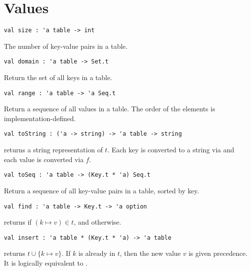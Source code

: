 \section{Values}

\begin{gram}[size]
\begin{verbatim}
val size : 'a table -> int
\end{verbatim}
The number of key-value pairs in a table.
\end{gram}

\begin{gram}[domain]
\begin{verbatim}
val domain : 'a table -> Set.t
\end{verbatim}
Return the set of all keys in a table.
\end{gram}

\begin{gram}[range]
\begin{verbatim}
val range : 'a table -> 'a Seq.t
\end{verbatim}
Return a sequence of all values in a table. The order of the elements is
implementation-defined.
\end{gram}

\begin{gram}[toString]
\begin{verbatim}
val toString : ('a -> string) -> 'a table -> string
\end{verbatim}
 returns a string representation of $t$. Each key is converted
to a string via  and each value is converted via $f$.
\end{gram}

\begin{gram}[toSeq]
\begin{verbatim}
val toSeq : 'a table -> (Key.t * 'a) Seq.t
\end{verbatim}
Return a sequence of all key-value pairs in a table, sorted by key.
\end{gram}

\begin{gram}[find]
\begin{verbatim}
val find : 'a table -> Key.t -> 'a option
\end{verbatim}
 returns  if $(k \mapsto v) \in t$, and 
otherwise.
\end{gram}

\begin{gram}[insert]
\begin{verbatim}
val insert : 'a table * (Key.t * 'a) -> 'a table
\end{verbatim}
 returns $t \cup \{k \mapsto v\}$. If $k$ is already
in $t$, then the new value $v$ is given precedence. It is logically equivalent
to .
\end{gram}

